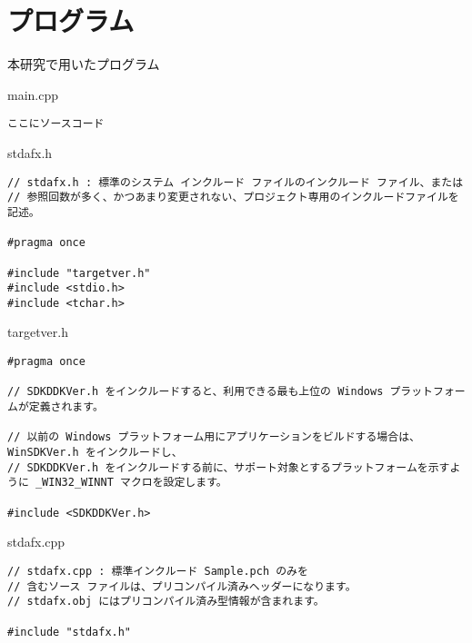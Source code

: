 \chapter{プログラム}
\thispagestyle{fancy}

本研究で用いたプログラム

\vspace{0.5cm}

main.cpp
\begin{lstlisting}
ここにソースコード
\end{lstlisting}



\vspace{1cm}



stdafx.h
\begin{lstlisting}
// stdafx.h : 標準のシステム インクルード ファイルのインクルード ファイル、または
// 参照回数が多く、かつあまり変更されない、プロジェクト専用のインクルードファイルを記述。

#pragma once

#include "targetver.h"
#include <stdio.h>
#include <tchar.h>
\end{lstlisting}



\vspace{1.5cm}



targetver.h
\begin{lstlisting}
#pragma once

// SDKDDKVer.h をインクルードすると、利用できる最も上位の Windows プラットフォームが定義されます。

// 以前の Windows プラットフォーム用にアプリケーションをビルドする場合は、WinSDKVer.h をインクルードし、
// SDKDDKVer.h をインクルードする前に、サポート対象とするプラットフォームを示すように _WIN32_WINNT マクロを設定します。

#include <SDKDDKVer.h>
\end{lstlisting}


\vspace{1.5cm}

stdafx.cpp
\begin{lstlisting}
// stdafx.cpp : 標準インクルード Sample.pch のみを
// 含むソース ファイルは、プリコンパイル済みヘッダーになります。
// stdafx.obj にはプリコンパイル済み型情報が含まれます。

#include "stdafx.h"
\end{lstlisting}

